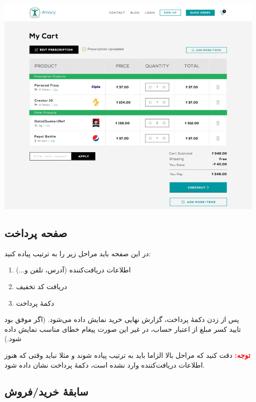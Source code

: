\documentclass[]{article}
\begin{document}
\begin{center}
\includegraphics[width=1.1\textwidth]{images/image27.png}
\end{center}

\newpage


\subsection*{{\titr صفحه پرداخت }}

در این صفحه باید مراحل زیر را به ترتیب پیاده کنید:

\begin{enumerate}
\item
اطلاعات دریافت‌کننده (آدرس، تلفن و...)

\item
دریافت کد تخفیف

\item
دکمهٔ پرداخت

\end{enumerate}

پس از زدن دکمهٔ پرداخت، گزارش نهایی خرید نمایش داده می‌شود. (اگر موفق بود تایید کسر مبلغ از اعتبار حساب، در غیر این صورت پیغام خطای مناسب نمایش داده شود.)

\textbf{\textcolor{red}{توجه:}}
 دقت کنید که مراحل بالا الزاما باید به ترتیب پیاده شوند و مثلا نباید وقتی که هنوز اطلاعات دریافت‌کننده وارد نشده است، دکمهٔ پرداخت نشان داده شود.


\subsection*{{\titr سابقهٔ خرید/فروش }}
\end{document}
